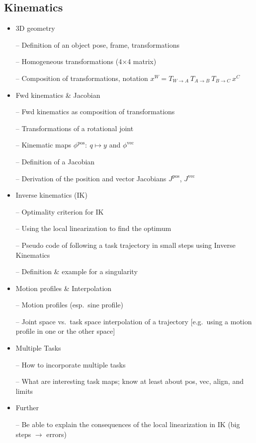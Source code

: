 \subsection{Kinematics}

\begin{itemize}
\item 3D geometry

-- Definition of an object pose, frame, transformations

-- Homogeneous transformations (4$\times$4 matrix)

-- Composition of transformations, notation $x^W = T_{W\to A}~ T_{A\to B}~ T_{B\to C}~ x^C$

\item Fwd kinematics \& Jacobian

-- Fwd kinematics as composition of transformations

-- Transformations of a rotational joint

-- Kinematic maps $\phi^\text{pos}:~ q \mapsto y$ and $\phi^\text{vec}$

-- Definition of a Jacobian

-- Derivation of the position and vector Jacobians $J^\text{pos}$,
$J^\text{vec}$

\item Inverse kinematics (IK)

-- Optimality criterion for IK

-- Using the local linearization to find the optimum

-- Pseudo code of following a task trajectory in small steps using Inverse Kinematics

-- Definition \& example for a singularity

\item Motion profiles \& Interpolation

-- Motion profiles (esp.\ sine profile)

-- Joint space vs.\ task space interpolation of a trajectory
[e.g.\ using a motion profile in one or the other space]

\item Multiple Tasks

-- How to incorporate multiple tasks

-- What are interesting task maps; know at least about pos, vec,
align, and limits

\item Further

-- Be able to explain the consequences of the local linearization in
IK (big steps $\to$ errors)

\end{itemize}

